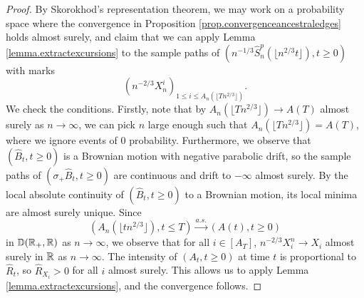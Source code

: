 \begin{proof}
By Skorokhod's representation theorem, we may work on a probability space where the convergence in Proposition \ref{prop.convergenceancestraledges} holds almost surely, and claim that we can apply Lemma \ref{lemma.extractexcursions} to the sample paths of $\left(n^{-1/3}\hat{S}^{p}_n\left(\lfloor n^{2/3}t\rfloor\right),t \geq 0\right)$ with marks $$\left(n^{-2/3}X_n^i\right)_{1\leq i\leq A_n\left(\lfloor T n^{2/3}\rfloor\right)}.$$ We check the conditions.
Firstly, note that by $A_n\left(\lfloor T n^{2/3}\rfloor\right)\to A\left(T\right)$ almost surely as $n\to \infty$, we can pick $n$ large enough such that $A_n\left(\lfloor T n^{2/3}\rfloor\right)=A\left(T\right)$, where we ignore events of $0$ probability. Furthermore, we observe that $(\hat{B}_t,t\geq 0)$ is a Brownian motion with negative parabolic drift, so the sample paths of $(\sigma_+\hat{B}_t,t\geq 0)$ are continuous and drift to $-\infty$ almost surely. By the local absolute continuity of $(\hat{B}_t,t\geq 0)$ to a Brownian motion, its local minima are almost surely unique. Since
$$\left(A_n\left(\lfloor t n^{2/3}\rfloor\right), t\leq T\right) \overset{a.s.}{\to}\left(A\left(t\right),t\geq 0\right)$$
in ${\mathbb D}({\mathbb R}_+,{\mathbb R})$ as $n\to \infty$, we observe that for all $i\in [A_T]$, $n^{-2/3}X_i^n\to X_i$ almost surely in ${\mathbb R}$ as $n\to \infty$. The intensity of $(A_t,t\geq 0)$ at time $t$ is proportional to $\hat{R}_t$, so $\hat{R}_{X_i}>0$ for all $i$ almost surely. This allows us to apply Lemma \ref{lemma.extractexcursions}, and the convergence follows.
\end{proof}

